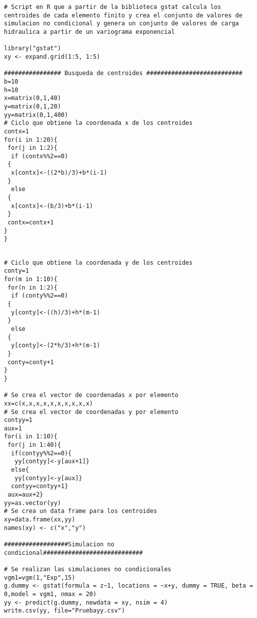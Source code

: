 \begin{lstlisting}[frame=single]
# Script en R que a partir de la biblioteca gstat calcula los centroides de cada elemento finito y crea el conjunto de valores de simulacion no condicional y genera un conjunto de valores de carga hidraulica a partir de un variograma exponencial

library("gstat")
xy <- expand.grid(1:5, 1:5)

################ Busqueda de centroides ###########################
b=10
h=10
x=matrix(0,1,40)
y=matrix(0,1,20)
yy=matrix(0,1,400)
# Ciclo que obtiene la coordenada x de los centroides
contx=1
for(i in 1:20){
 for(j in 1:2){
  if (contx%%2==0) 
 { 
  x[contx]<-((2*b)/3)+b*(i-1)
 }
  else 
 {
  x[contx]<-(b/3)+b*(i-1)
 }
 contx=contx+1
}
}
\end{lstlisting}
\newpage

\begin{lstlisting}[frame=single]

# Ciclo que obtiene la coordenada y de los centroides
conty=1
for(m in 1:10){
 for(n in 1:2){
  if (conty%%2==0) 
 { 
  y[conty]<-((h)/3)+h*(m-1)
 }
  else 
 {
  y[conty]<-(2*h/3)+h*(m-1)
 }
 conty=conty+1
}
}

# Se crea el vector de coordenadas x por elemento
xx=c(x,x,x,x,x,x,x,x,x,x)
# Se crea el vector de coordenadas y por elemento
contyy=1
aux=1
for(i in 1:10){
 for(j in 1:40){
  if(contyy%%2==0){
   yy[contyy]<-y[aux+1]}
  else{
   yy[contyy]<-y[aux]}
  contyy=contyy+1}
 aux=aux+2}
yy=as.vector(yy)
# Se crea un data frame para los centroides
xy=data.frame(xx,yy)
names(xy) <- c("x","y")

##################Simulacion no condicional############################

# Se realizan las simulaciones no condicionales
vgm1=vgm(1,"Exp",15)
g.dummy <- gstat(formula = z~1, locations = ~x+y, dummy = TRUE, beta = 0,model = vgm1, nmax = 20)
yy <- predict(g.dummy, newdata = xy, nsim = 4)
write.csv(yy, file="Pruebayy.csv")


\end{lstlisting}


